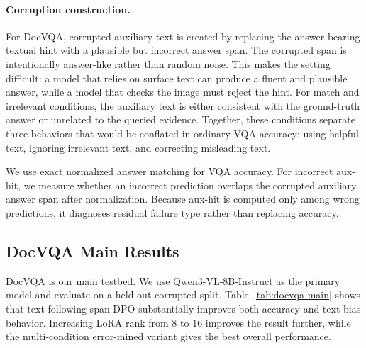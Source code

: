 \paragraph{Corruption construction.}
For DocVQA, corrupted auxiliary text is created by replacing the answer-bearing textual hint with a plausible but incorrect answer span.
The corrupted span is intentionally answer-like rather than random noise.
This makes the setting difficult: a model that relies on surface text can produce a fluent and plausible answer, while a model that checks the image must reject the hint.
For match and irrelevant conditions, the auxiliary text is either consistent with the ground-truth answer or unrelated to the queried evidence.
Together, these conditions separate three behaviors that would be conflated in ordinary VQA accuracy: using helpful text, ignoring irrelevant text, and correcting misleading text.

We use exact normalized answer matching for VQA accuracy.
For incorrect aux-hit, we measure whether an incorrect prediction overlaps the corrupted auxiliary answer span after normalization.
Because aux-hit is computed only among wrong predictions, it diagnoses residual failure type rather than replacing accuracy.

\subsection{DocVQA Main Results}

DocVQA is our main testbed.
We use Qwen3-VL-8B-Instruct as the primary model and evaluate on a held-out corrupted split.
Table~\ref{tab:docvqa-main} shows that text-following span DPO substantially improves both accuracy and text-bias behavior.
Increasing LoRA rank from 8 to 16 improves the result further, while the multi-condition error-mined variant gives the best overall performance.

\begin{table}[t]
\centering
\caption{DocVQA corrupted held-out results with Qwen3-VL-8B.}
\label{tab:docvqa-main}
\end{table}

